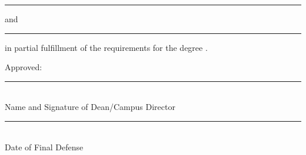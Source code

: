 {  \vspace{1.25\baselineskip}
  \noindent\rule{0.18\textwidth}{0.4pt} and \rule{0.18\textwidth}{0.4pt} in partial fulfillment of the requirements for the degree \textbf{\DegreeFull}.

  \vspace{2\baselineskip}
  \noindent Approved:\\[0.75\baselineskip]
  \noindent\rule{0.45\textwidth}{0.4pt}\\
  \noindent Name and Signature of Dean/Campus Director

  \vspace{0.75\baselineskip}
  \noindent\rule{0.36\textwidth}{0.4pt}\\
  \noindent Date of Final Defense
}
